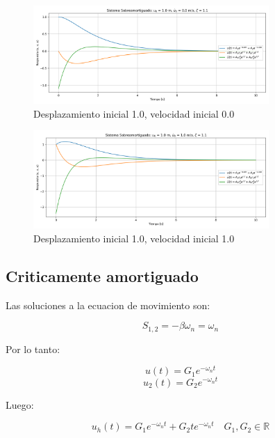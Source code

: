 \documentclass{article}  %
\begin{document}
\begin{figure}[H]
    \centering
    \includegraphics[width=0.8\textwidth]{GRAFICOS/sis_sobreamortiguado_u0_1.0_v0_0.0_zeta_1.1.png}
    \caption{Desplazamiento inicial 1.0, velocidad inicial 0.0}
    \label{fig:ejemplo1}
\end{figure}

\begin{figure}[H]
    \centering
    \includegraphics[width=0.8\textwidth]{GRAFICOS/sis_sobreamortiguado_u0_1.0_v0_1.0_zeta_1.1.png}
    \caption{Desplazamiento inicial 1.0, velocidad inicial 1.0}
    \label{fig:ejemplo1}
\end{figure}

\subsection{Criticamente amortiguado}

Las soluciones a la ecuacion de movimiento son:

\begin{equation}
   S_{1,2} = -\beta \omega_n = \omega_n
\end{equation}

Por lo tanto:

\begin{equation}
    u(t) = G_1e^{-\omega_n t} 
\end{equation}
\begin{equation}
    u_2(t) = G_2e^{-\omega_n t}
\end{equation}

Luego:

\begin{equation}
    u_h(t) = G_1e^{-\omega_n t} + G_2te^{-\omega_n t} \quad G_1, G_2 \in \mathbb{R}
\end{equation}
\end{document}
